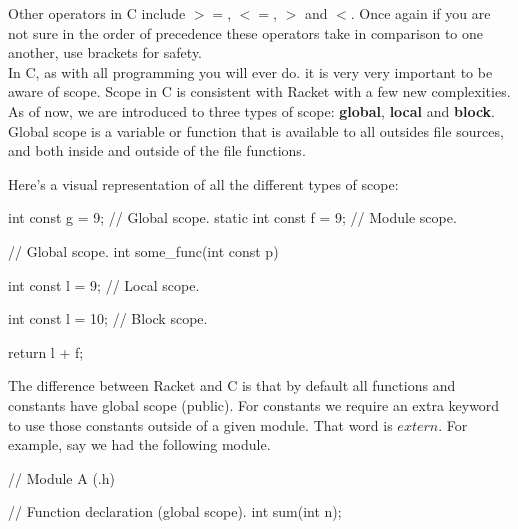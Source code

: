 Other operators in C include $>=$, $<=$, $>$ and $<$.  Once again if you are not sure in the order of precedence these operators take in comparison to one another, use brackets for safety.\\

In C, as with all programming you will ever do. it is very very important to be aware of scope.  Scope in C is consistent with Racket with a few new complexities.  As of now, we are introduced to three types of scope: \textbf{global}, \textbf{local} and \textbf{block}.\\

 {
Global scope is a variable or function that is available to all outsides file sources, and both inside and outside of the file functions.
	}

	

Here's a visual representation of all the different types of scope:\\

\begin{code}[C]
int const g = 9; // Global scope.
static int const f = 9; // Module scope.

// Global scope.
int some_func(int const p) 
{
	int const l = 9; // Local scope.
	
	{
		int const l = 10; // Block scope.
		
		return l + f;
	}
}
\end{code}

The difference between Racket and C is that by default all functions and constants have global scope (public). For constants we require an extra keyword to use those constants outside of a given module. That word is $extern$.  For example, say we had the following module.\\

\begin{code}[C]
// Module A (.h)

// Function declaration (global scope).
int sum(int n);
\end{code}

